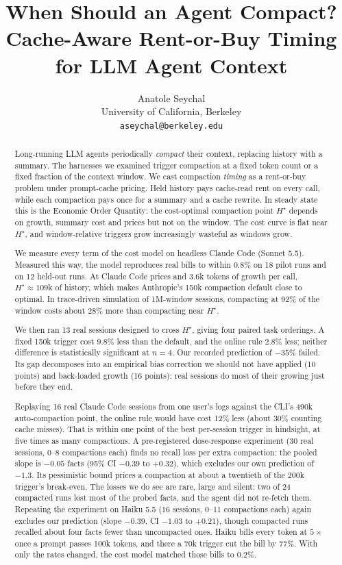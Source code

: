 \documentclass[11pt]{article}
\title{When Should an Agent Compact?\\Cache-Aware Rent-or-Buy Timing for LLM Agent Context}
\author{Anatole Seychal\\University of California, Berkeley\\\texttt{aseychal@berkeley.edu}}\fi
\date{}
\begin{document}
\maketitle

\begin{abstract}
Long-running LLM agents periodically \emph{compact} their context, replacing history with a summary. The harnesses we examined trigger compaction at a fixed token count or a fixed fraction of the context window. We cast compaction \emph{timing} as a rent-or-buy problem under prompt-cache pricing. Held history pays cache-read rent on every call, while each compaction pays once for a summary and a cache rewrite. In steady state this is the Economic Order Quantity: the cost-optimal compaction point $H^\star$ depends on growth, summary cost and prices but not on the window. The cost curve is flat near $H^\star$, and window-relative triggers grow increasingly wasteful as windows grow.

We measure every term of the cost model on headless Claude Code (Sonnet 5.5). Measured this way, the model reproduces real bills to within 0.8\% on 18 pilot runs and on 12 held-out runs. At Claude Code prices and 3.6k tokens of growth per call, $H^\star\approx109$k of history, which makes Anthropic's 150k compaction default close to optimal. In trace-driven simulation of 1M-window sessions, compacting at 92\% of the window costs about 28\% more than compacting near $H^\star$.

We then ran 13 real sessions designed to cross $H^\star$, giving four paired task orderings. A fixed 150k trigger cost $9.8\%$ less than the default, and the online rule $2.8\%$ less; neither difference is statistically significant at $n=4$. Our recorded prediction of $-35\%$ failed. Its gap decomposes into an empirical bias correction we should not have applied (10 points) and back-loaded growth (16 points): real sessions do most of their growing just before they end.

Replaying 16 real Claude Code sessions from one user's logs against the CLI's 490k auto-compaction point, the online rule would have cost 12\% less (about 30\% counting cache misses). That is within one point of the best per-session trigger in hindsight, at five times as many compactions. A pre-registered dose-response experiment (30 real sessions, 0--8 compactions each) finds no recall loss per extra compaction: the pooled slope is $-0.05$ facts (95\% CI $-0.39$ to $+0.32$), which excludes our own prediction of $-1.3$. Its pessimistic bound prices a compaction at about a twentieth of the 200k trigger's break-even. The losses we do see are rare, large and silent: two of 24 compacted runs lost most of the probed facts, and the agent did not re-fetch them. Repeating the experiment on Haiku 5.5 (16 sessions, 0--11 compactions each) again excludes our prediction (slope $-0.39$, CI $-1.03$ to $+0.21$), though compacted runs recalled about four facts fewer than uncompacted ones. Haiku bills every token at $5\times$ once a prompt passes 100k tokens, and there a 70k trigger cut the bill by 77\%. With only the rates changed, the cost model matched those bills to 0.2\%.


\end{abstract}
\end{document}
